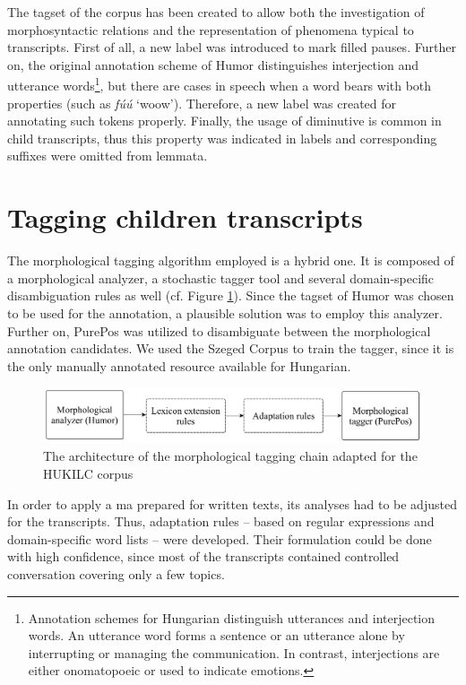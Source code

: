 The tagset of the corpus has been created to allow both the investigation of morphosyntactic relations and the representation of phenomena typical to transcripts. 
First of all, a new label was introduced to mark filled pauses. 
Further on, the original annotation scheme of Humor distinguishes interjection and utterance words\footnote{Annotation schemes for Hungarian distinguish utterances and interjection words. An utterance word forms a sentence or an utterance alone by interrupting or managing the communication. In contrast, interjections are either onomatopoeic or used to indicate emotions.},
but there are cases in speech when a word bears with both properties (such as \textit{fúú} `woow’). 
Therefore, a new label was created for annotating such tokens properly. 
Finally, the usage of diminutive is common in child transcripts, thus this property was indicated in labels and corresponding suffixes were omitted from lemmata.

\section{Tagging children transcripts}
\label{sec:tagging}
The morphological tagging algorithm employed is a hybrid one. 
It is composed of a morphological analyzer, a stochastic tagger tool and several domain-specific disambiguation rules as well (cf. Figure \ref{fig:speech-tagger}). 
Since the tagset of Humor was chosen to be used for the annotation, a plausible solution was to employ this analyzer. 
Further on, PurePos was utilized to disambiguate between the morphological annotation candidates. 
We used the Szeged Corpus \cite{Csendes2004} to train the tagger, since it is the only manually annotated resource available for Hungarian. 

\begin{figure}[H]
  \centering
  \includegraphics[scale=0.2]{MorphComplexity/mlu_architecture.png} 
  \caption{The architecture of the morphological tagging chain adapted for the HUKILC corpus}
  \label{fig:speech-tagger}
\end{figure}


In order to apply a \acrlong{ma} prepared for written texts, its analyses had to be adjusted for the transcripts. 
Thus, adaptation rules -- based on regular expressions and domain-specific word lists -- were developed.
Their formulation could be done with high confidence, since most of the transcripts contained controlled conversation covering only a few topics. 

